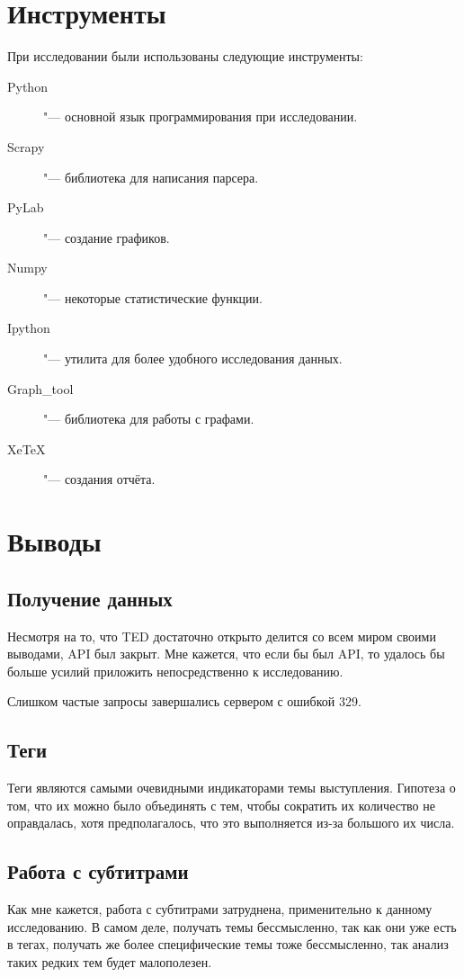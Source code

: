 \documentclass[12pt,a4paper]{scrartcl}
\begin{document}
\section{Инструменты}
При исследовании были использованы следующие инструменты:
\begin{description}
\item[Python] "--- основной язык программирования при исследовании.
\item[Scrapy] "--- библиотека для написания парсера.
\item[PyLab] "--- создание графиков.
\item[Numpy] "--- некоторые статистические функции.
\item[Ipython] "--- утилита для более удобного исследования данных.
\item[Graph\_tool] "--- библиотека для работы с графами.
\item[XeTeX] "--- создания отчёта.
\end{description}
\section{Выводы}

\subsection{Получение данных}
Несмотря на то, что TED достаточно открыто делится со всем миром своими выводами, API был закрыт. Мне кажется, что если бы был API, то удалось бы больше усилий приложить непосредственно к исследованию.

Слишком частые запросы завершались сервером с ошибкой 329.
\subsection{Теги}
Теги являются самыми очевидными индикаторами темы выступления. Гипотеза о том, что их можно было объединять с тем, чтобы сократить их количество не оправдалась, хотя предполагалось, что это выполняется из-за большого их числа.
\subsection{Работа с субтитрами}
Как мне кажется, работа с субтитрами затруднена, применительно к данному исследованию. В самом деле, получать темы бессмысленно, так как они уже есть в тегах, получать же более специфические темы тоже бессмысленно, так анализ таких редких тем будет малополезен.
\end{document}
